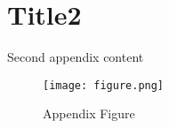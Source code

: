 \section{Title2}\label{apx:Title2}
Second appendix content

\begin{figure}
    \centering
    \texttt{[image: figure.png]}
    \caption{Appendix Figure}
    \label{fig:my test appendix figure}
\end{figure}